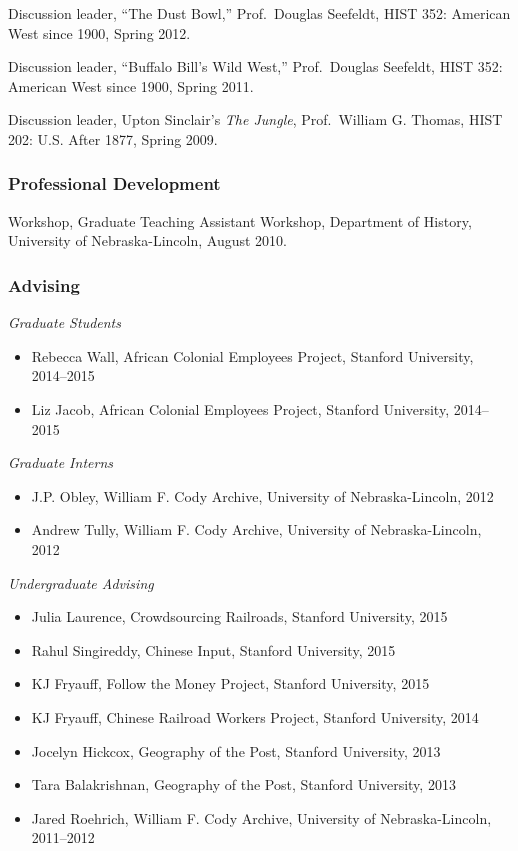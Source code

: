 Discussion leader, ``The Dust Bowl,'' Prof.~Douglas Seefeldt, HIST 352:
American West since 1900, Spring 2012.

Discussion leader, ``Buffalo Bill's Wild West,'' Prof.~Douglas Seefeldt,
HIST 352: American West since 1900, Spring 2011.

Discussion leader, Upton Sinclair's \emph{The Jungle}, Prof.~William G.
Thomas, HIST 202: U.S. After 1877, Spring 2009.

\subsubsection{Professional
Development}\label{professional-development-1}

Workshop, Graduate Teaching Assistant Workshop, Department of History,
University of Nebraska-Lincoln, August 2010.

\subsubsection{Advising}\label{advising}

\emph{Graduate Students}

\begin{itemize}
\tightlist
\item
  Rebecca Wall, African Colonial Employees Project, Stanford University,
  2014--2015
\item
  Liz Jacob, African Colonial Employees Project, Stanford University,
  2014--2015
\end{itemize}

\emph{Graduate Interns}

\begin{itemize}
\tightlist
\item
  J.P. Obley, William F. Cody Archive, University of Nebraska-Lincoln,
  2012
\item
  Andrew Tully, William F. Cody Archive, University of Nebraska-Lincoln,
  2012
\end{itemize}

\emph{Undergraduate Advising}

\begin{itemize}
\tightlist
\item
  Julia Laurence, Crowdsourcing Railroads, Stanford University, 2015
\item
  Rahul Singireddy, Chinese Input, Stanford University, 2015
\item
  KJ Fryauff, Follow the Money Project, Stanford University, 2015
\item
  KJ Fryauff, Chinese Railroad Workers Project, Stanford University,
  2014
\item
  Jocelyn Hickcox, Geography of the Post, Stanford University, 2013
\item
  Tara Balakrishnan, Geography of the Post, Stanford University, 2013
\item
  Jared Roehrich, William F. Cody Archive, University of
  Nebraska-Lincoln, 2011--2012
\end{itemize}


